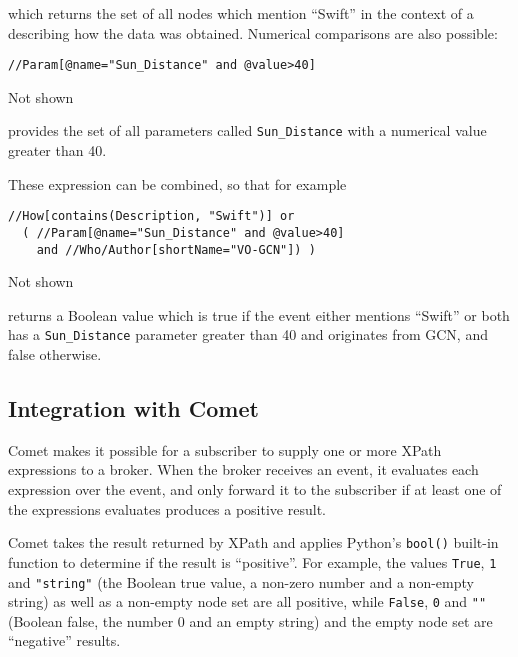 \documentclass[5p,authoryear]{elsarticle}
\begin{document}
which returns the set of all nodes which mention ``Swift'' in the context of a
describing how the data was obtained. Numerical comparisons are also possible:

\begin{listing}[H]
\begin{verbatim}
//Param[@name="Sun_Distance" and @value>40]
\end{verbatim}
\vspace{-19pt}
\captionsetup{labelsep=none,textformat=empty,justification=raggedleft,singlelinecheck=false}
\caption{Not shown}
\label{xpath:exp3}
\end{listing}

provides the set of all parameters called \texttt{Sun\_Distance} with a
numerical value greater than 40.

These expression can be combined, so that for example

\begin{listing}[H]
\begin{verbatim}
//How[contains(Description, "Swift")] or
  ( //Param[@name="Sun_Distance" and @value>40]
    and //Who/Author[shortName="VO-GCN"]) )
\end{verbatim}
\vspace{-19pt}
\captionsetup{labelsep=none,textformat=empty,justification=raggedleft,singlelinecheck=false}
\caption{Not shown}
\label{xpath:exp4}
\end{listing}

returns a Boolean value which is true if the event either mentions ``Swift''
or both has a \texttt{Sun\_Distance} parameter greater than 40 and originates
from GCN, and false otherwise.

\setcounter{listing}{\value{savelisting}}%
\endgroup
\subsection{Integration with Comet}

Comet makes it possible for a subscriber to supply one or more XPath
expressions to a broker. When the broker receives an event, it evaluates each
expression over the event, and only forward it to the subscriber if at least
one of the expressions evaluates produces a positive result.

Comet takes the result returned by XPath and applies Python's \texttt{bool()}
built-in function to determine if the result is ``positive''. For example, the
values \texttt{True}, \texttt{1} and \texttt{"string"} (the Boolean true
value, a non-zero number and a non-empty string) as well as a non-empty node
set are all positive, while \texttt{False}, \texttt{0} and \texttt{""}
(Boolean false, the number 0 and an empty string) and the empty node set are
``negative'' results.
\end{document}
